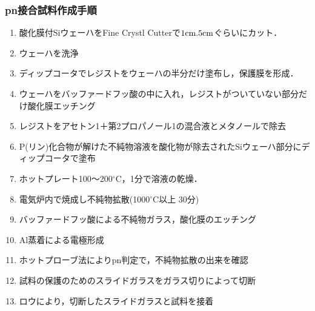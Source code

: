 \documentclass[11pt]{jarticle}
\begin{document}
		\subsubsection{pn接合試料作成手順}
			\begin{enumerate}
				\item 酸化膜付SiウェーハをFine Crystl Cutterで$1\mathrm{cm} \time 2.5\mathrm{cm}$ぐらいにカット．
				\item ウェーハを洗浄
				\item ディップコータでレジストをウェーハの半分だけ塗布し，保護膜を形成．
				\item ウェーハをバッファードフッ酸の中に入れ，レジストがついていない部分だけ酸化膜エッチング
				\item レジストをアセトン1＋第2プロパノール1の混合液とメタノールで除去
				\item P(リン)化合物が解けた不純物溶液を酸化物が除去されたSiウェーハ部分にディップコータで塗布
				\item ホットプレート100～200$^\circ \mathrm{C}$，1分で溶液の乾燥．
				\item 電気炉内で焼成し不純物拡散(1000$^\circ \mathrm{C}$以上 30分)
				\item バッファードフッ酸による不純物ガラス，酸化膜のエッチング
				\item Al蒸着による電極形成
				\item ホットプローブ法によりpn判定で，不純物拡散の出来を確認
				\item 試料の保護のためのスライドガラスをガラス切りによって切断
				\item ロウにより，切断したスライドガラスと試料を接着
			\end{enumerate}
\end{document}
